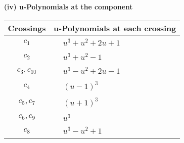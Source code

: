 \documentclass[1p]{elsarticle_modified}
\theoremstyle{definition}
\begin{document}
\newpage\renewcommand{\arraystretch}{1}
\flushleft \textbf{(iv) u-Polynomials at the component}\newline \\
\begin{tabular}{m{50pt}|m{274pt}}
Crossings & \hspace{64pt}u-Polynomials at each crossing \\
\hline $$\begin{aligned}c_{1}\end{aligned}$$&$\begin{aligned}
&u^3+u^2+2 u+1
\end{aligned}$\\
\hline $$\begin{aligned}c_{2}\end{aligned}$$&$\begin{aligned}
&u^3+u^2-1
\end{aligned}$\\
\hline $$\begin{aligned}c_{3},c_{10}\end{aligned}$$&$\begin{aligned}
&u^3- u^2+2 u-1
\end{aligned}$\\
\hline $$\begin{aligned}c_{4}\end{aligned}$$&$\begin{aligned}
&(u-1)^3
\end{aligned}$\\
\hline $$\begin{aligned}c_{5},c_{7}\end{aligned}$$&$\begin{aligned}
&(u+1)^3
\end{aligned}$\\
\hline $$\begin{aligned}c_{6},c_{9}\end{aligned}$$&$\begin{aligned}
&u^3
\end{aligned}$\\
\hline $$\begin{aligned}c_{8}\end{aligned}$$&$\begin{aligned}
&u^3- u^2+1
\end{aligned}$\\
\hline
\end{tabular}\\~\\
\newpage\renewcommand{\arraystretch}{1}
\end{document}
